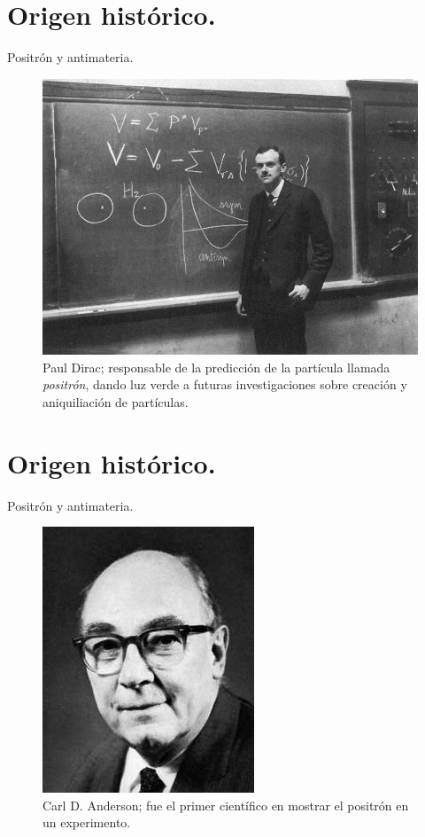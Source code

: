 \documentclass{beamer}
\begin{document}
\section{Origen histórico.}

\begin{frame}{Positrón y antimateria.}
\begin{figure}
    \centering
    \includegraphics[scale=.25]{dirac.jpg}
    \caption{Paul Dirac; responsable de la predicción de la partícula llamada \textit{positrón}, dando luz verde a futuras investigaciones sobre creación y aniquiliación de partículas.}
    \label{fig:dirac}
\end{figure}


\end{frame}

\section{Origen histórico.}

\begin{frame}{Positrón y antimateria.}
\begin{figure}
    \centering
    \includegraphics[scale=.45]{anderson.jpg}
    \caption{Carl D. Anderson; fue el primer científico en mostrar el positrón en un experimento.}
    \label{fig:anderson}
\end{figure}


\end{frame}
\end{document}
